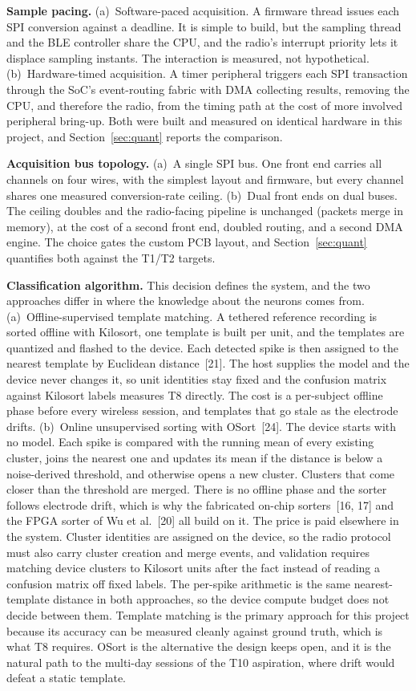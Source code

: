 \documentclass[11pt]{article}
\begin{document}
\textbf{Sample pacing.} (a)~Software-paced acquisition. A firmware thread issues each
SPI conversion against a deadline. It is simple to build, but the sampling thread and
the BLE controller share the CPU, and the radio's interrupt priority lets it displace
sampling instants. The interaction is measured, not hypothetical. (b)~Hardware-timed
acquisition. A timer peripheral triggers each SPI transaction through the SoC's
event-routing fabric with DMA collecting results, removing the CPU, and therefore the
radio, from the timing path at the cost of more involved peripheral bring-up. Both were
built and measured on identical hardware in this project, and Section~\ref{sec:quant} reports the
comparison.

\textbf{Acquisition bus topology.} (a)~A single SPI bus. One front end carries all
channels on four wires, with the simplest layout and firmware, but every channel shares
one measured conversion-rate ceiling. (b)~Dual front ends on dual buses. The ceiling
doubles and the radio-facing pipeline is unchanged (packets merge in memory), at the
cost of a second front end, doubled routing, and a second DMA engine. The choice gates
the custom PCB layout, and Section~\ref{sec:quant} quantifies both against the T1/T2 targets.

\textbf{Classification algorithm.} This decision defines the system, and the two approaches
differ in where the knowledge about the neurons comes from. (a)~Offline-supervised
template matching. A tethered reference recording is sorted offline with Kilosort, one
template is built per unit, and the templates are quantized and flashed to the device. Each
detected spike is then assigned to the nearest template by Euclidean distance~[21]. The host
supplies the model and the device never changes it, so unit identities stay fixed and the
confusion matrix against Kilosort labels measures T8 directly. The cost is a per-subject
offline phase before every wireless session, and templates that go stale as the electrode
drifts. (b)~Online unsupervised sorting with OSort~[24]. The device starts with no model.
Each spike is compared with the running mean of every existing cluster, joins the nearest
one and updates its mean if the distance is below a noise-derived threshold, and otherwise
opens a new cluster. Clusters that come closer than the threshold are merged. There is no
offline phase and the sorter follows electrode drift, which is why the fabricated on-chip
sorters~[16, 17] and the FPGA sorter of Wu et al.~[20] all build on it. The price is paid
elsewhere in the system. Cluster identities are assigned on the device, so the radio
protocol must also carry cluster creation and merge events, and validation requires
matching device clusters to Kilosort units after the fact instead of reading a confusion
matrix off fixed labels. The per-spike arithmetic is the same nearest-template distance in
both approaches, so the device compute budget does not decide between them. Template
matching is the primary approach for this project because its accuracy can be measured
cleanly against ground truth, which is what T8 requires. OSort is the alternative the
design keeps open, and it is the natural path to the multi-day sessions of the T10
aspiration, where drift would defeat a static template.
\end{document}
